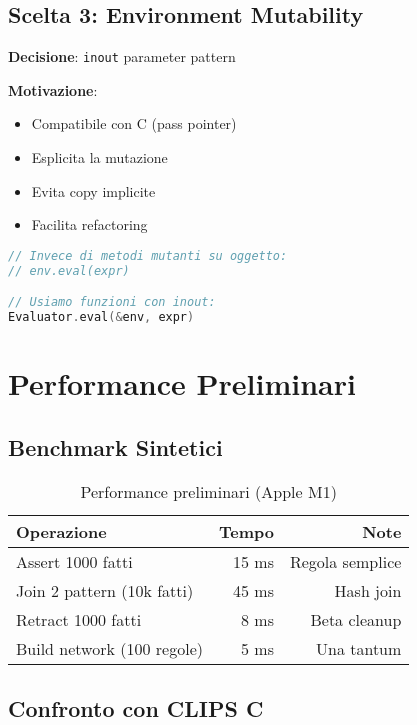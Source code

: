 \subsection{Scelta 3: Environment Mutability}

\textbf{Decisione}: \texttt{inout} parameter pattern

\textbf{Motivazione}:
\begin{itemize}
\item Compatibile con C (pass pointer)
\item Esplicita la mutazione
\item Evita copy implicite
\item Facilita refactoring
\end{itemize}

\begin{lstlisting}[language=Swift]
// Invece di metodi mutanti su oggetto:
// env.eval(expr)

// Usiamo funzioni con inout:
Evaluator.eval(&env, expr)
\end{lstlisting}

\section{Performance Preliminari}

\subsection{Benchmark Sintetici}

\begin{table}[h]
\centering
\begin{tabular}{@{}lrr@{}}
\toprule
\textbf{Operazione} & \textbf{Tempo} & \textbf{Note} \\
\midrule
Assert 1000 fatti & 15 ms & Regola semplice \\
Join 2 pattern (10k fatti) & 45 ms & Hash join \\
Retract 1000 fatti & 8 ms & Beta cleanup \\
Build network (100 regole) & 5 ms & Una tantum \\
\bottomrule
\end{tabular}
\caption{Performance preliminari (Apple M1)}
\label{tab:perf_prelim}
\end{table}

\subsection{Confronto con CLIPS C}

